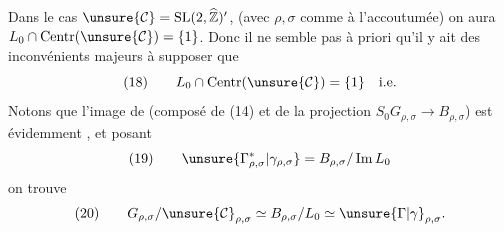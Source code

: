 Dans le cas $\unsure{\mathcal{C}}=\mathrm{SL}(2,\widehat{\mathbb Z})'$, (avec $\rho,\sigma$ comme à l'accoutumée) on aura $L_0\cap\mathrm{Centr}(\unsure{\mathcal{C}})=\{1\}$. Donc il ne semble pas à priori qu'il y ait des inconvénients majeurs à supposer que
\[
(18)\qquad L_0\cap\mathrm{Centr}(\unsure{\mathcal{C}})=\{1\}\quad\text{i.e.}
\]
Notons que  l'image de
(composé de (14) et de la projection $S_0G_{\rho,\sigma}\longrightarrow B_{\rho,\sigma}$) est évidemment , et posant
\[
(19)\qquad\unsure{\Gamma_{\rho,\sigma}^{*}|\gamma_{\rho,\sigma}}=B_{\rho,\sigma}/\operatorname{Im}L_0
\]
on trouve
\[
(20)\qquad G_{\rho,\sigma}/\unsure{\mathcal{C}}_{\rho,\sigma}\simeq B_{\rho,\sigma}/L_0\simeq\unsure{\Gamma|\gamma}_{\rho,\sigma}.
\]

